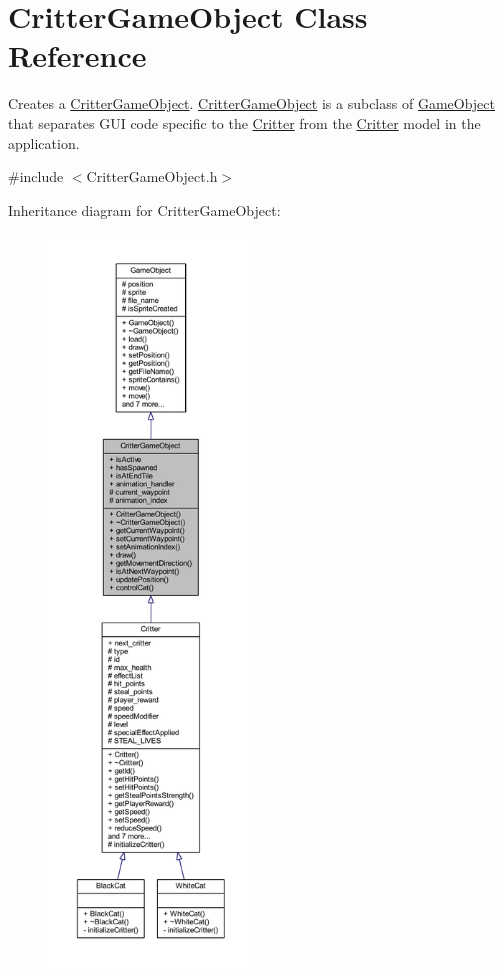 \hypertarget{class_critter_game_object}{\section{Critter\+Game\+Object Class Reference}
\label{class_critter_game_object}
}


Creates a \hyperlink{class_critter_game_object}{Critter\+Game\+Object}. \hyperlink{class_critter_game_object}{Critter\+Game\+Object} is a subclass of \hyperlink{class_game_object}{Game\+Object} that separates G\+U\+I code specific to the \hyperlink{class_critter}{Critter} from the \hyperlink{class_critter}{Critter} model in the application.  




{\ttfamily \#include $<$Critter\+Game\+Object.\+h$>$}



Inheritance diagram for Critter\+Game\+Object\+:\nopagebreak
\begin{figure}[H]
\begin{center}
\leavevmode
\includegraphics[height=550pt]{class_critter_game_object__inherit__graph}
\end{center}
\end{figure}


